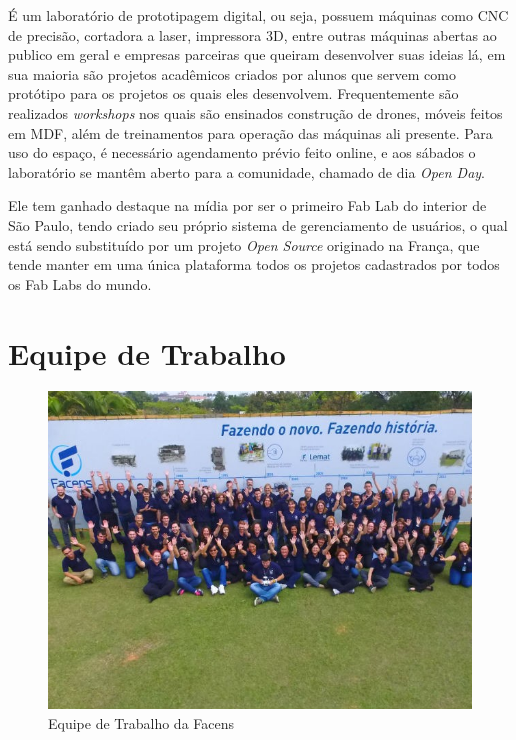 \documentclass[
	12pt,				%
	oneside,			%
	a4paper,			%
	chapter=TITLE,		%
	section=TITLE,		%
	sumario=tradicional %
	english,			%
	french,				%
	spanish,			%
	brazil				%
	]{abntex2}
\begin{document}
É um laboratório de prototipagem digital, ou seja, possuem máquinas como CNC de precisão, cortadora a laser, impressora 3D, entre outras máquinas abertas ao publico em geral e empresas parceiras que queiram desenvolver suas ideias lá, em sua maioria são projetos acadêmicos criados por alunos que servem como protótipo para os projetos os quais eles desenvolvem. Frequentemente são realizados \textit{workshops} nos quais são ensinados construção de drones, móveis feitos em MDF, além de treinamentos para operação das máquinas ali presente. Para uso do espaço, é necessário agendamento prévio feito online, e aos sábados o laboratório se mantêm aberto para a comunidade, chamado de dia \textit{Open Day}.

Ele tem ganhado destaque na mídia por ser o primeiro Fab Lab do interior de São Paulo, tendo criado seu próprio sistema de gerenciamento de usuários, o qual está sendo substituído por um projeto \textit{Open Source} originado na França, que tende manter em uma única plataforma todos os projetos cadastrados por todos os Fab Labs do mundo. 

\section{Equipe de Trabalho}

\begin{figure}[htb]
	\caption{\label{fig:equipefacens} Equipe de Trabalho da Facens}
	\begin{center}
		\includegraphics[scale=0.6]{equipefacens}
	\end{center}
\end{figure}
\end{document}
